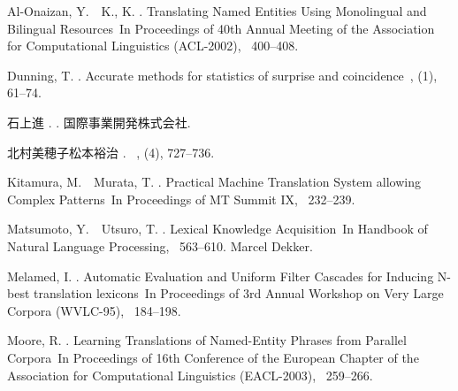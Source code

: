 
\begin{thebibliography}{}

Al-Onaizan, Y.\BBACOMMA\  \BBA\ K., K. \BBCP.
\newblock \BBOQ Translating Named Entities Using Monolingual and Bilingual
  Resources\BBCQ\
\newblock In {\Bem Proceedings of 40th Annual Meeting of the Association for
  Computational Linguistics (ACL-2002)}, \BPGS\ 400--408.

Dunning, T. \BBCP.
\newblock \BBOQ Accurate methods for statistics of surprise and
  coincidence\BBCQ\
, {}  (1), 61--74.

石上進 \BBOP 1992\BBCP.
\newblock {}.
\newblock 国際事業開発株式会社.

北村美穂子\JBA  松本裕治 \BBCP.
\newblock {}\JBCQ\
\newblock {}, {}  (4), 727--736.

Kitamura, M.\BBACOMMA\  \BBA\ Murata, T. \BBCP.
\newblock \BBOQ Practical Machine Translation System allowing Complex
  Patterns\BBCQ\
\newblock In {\Bem Proceedings of MT Summit IX}, \BPGS\ 232--239.

Matsumoto, Y.\BBACOMMA\  \BBA\ Utsuro, T. \BBOP 2000\BBCP.
\newblock \BBOQ Lexical Knowledge Acquisition\BBCQ\
\newblock In {\Bem Handbook of Natural Language Processing}, \BPGS\ 563--610.
  Marcel Dekker.

Melamed, I. \BBOP 1995\BBCP.
\newblock \BBOQ Automatic Evaluation and Uniform Filter Cascades for Inducing
  N-best translation lexicons\BBCQ\
\newblock In {\Bem Proceedings of 3rd Annual Workshop on Very Large Corpora
  (WVLC-95)}, \BPGS\ 184--198.

Moore, R. \BBCP.
\newblock \BBOQ Learning Translations of Named-Entity Phrases from Parallel
  Corpora\BBCQ\
\newblock In {\Bem Proceedings of 16th Conference of the European Chapter of
  the Association for Computational Linguistics (EACL-2003)}, \BPGS\ 259--266.


\end{thebibliography}
